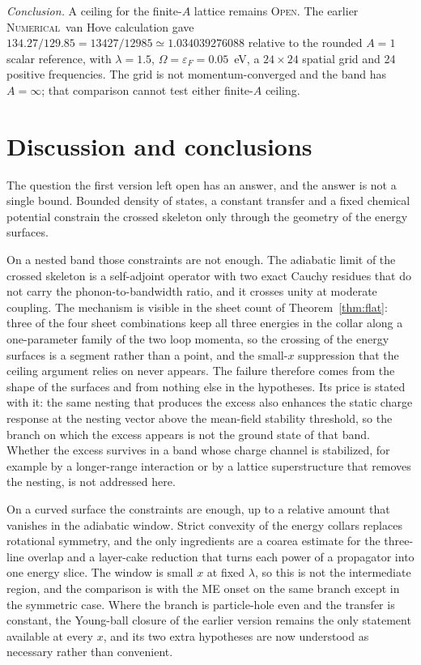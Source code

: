 \documentclass[11pt]{article}
\newcommand{\NUM}{\upshape\mdseries\textsc{Numerical}}
\newcommand{\OPEN}{\upshape\mdseries\textsc{Open}}
\theoremstyle{definition}
\theoremstyle{remark}
\begin{document}
\emph{Conclusion.} A ceiling for the finite-$A$ lattice remains \OPEN. The earlier \NUM\ van Hove calculation gave $134.27/129.85=13427/12985\simeq1.034039276088$ relative to the rounded $A=1$ scalar reference, with $\lambda=1.5$, $\Omega=\varepsilon_F=0.05$~eV, a $24\times24$ spatial grid and 24 positive frequencies. The grid is not momentum-converged and the band has $A=\infty$; that comparison cannot test either finite-$A$ ceiling.

\section{Discussion and conclusions}\label{sec:conclusions}

The question the first version left open has an answer, and the answer is not a single bound. Bounded density of states, a constant transfer and a fixed chemical potential constrain the crossed skeleton only through the geometry of the energy surfaces.

On a nested band those constraints are not enough. The adiabatic limit of the crossed skeleton is a self-adjoint operator with two exact Cauchy residues that do not carry the phonon-to-bandwidth ratio, and it crosses unity at moderate coupling. The mechanism is visible in the sheet count of Theorem~\ref{thm:flat}: three of the four sheet combinations keep all three energies in the collar along a one-parameter family of the two loop momenta, so the crossing of the energy surfaces is a segment rather than a point, and the small-$x$ suppression that the ceiling argument relies on never appears. The failure therefore comes from the shape of the surfaces and from nothing else in the hypotheses. Its price is stated with it: the same nesting that produces the excess also enhances the static charge response at the nesting vector above the mean-field stability threshold, so the branch on which the excess appears is not the ground state of that band. Whether the excess survives in a band whose charge channel is stabilized, for example by a longer-range interaction or by a lattice superstructure that removes the nesting, is not addressed here.

On a curved surface the constraints are enough, up to a relative amount that vanishes in the adiabatic window. Strict convexity of the energy collars replaces rotational symmetry, and the only ingredients are a coarea estimate for the three-line overlap and a layer-cake reduction that turns each power of a propagator into one energy slice. The window is small $x$ at fixed $\lambda$, so this is not the intermediate region, and the comparison is with the ME onset on the same branch except in the symmetric case. Where the branch is particle-hole even and the transfer is constant, the Young-ball closure of the earlier version remains the only statement available at every $x$, and its two extra hypotheses are now understood as necessary rather than convenient.
\end{document}
